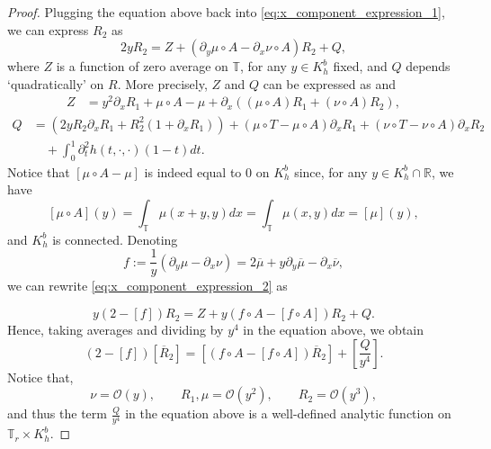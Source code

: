 \documentclass[10pt]{article}
\newcommand{\R}{\mathbb{R}}
\newcommand{\T}{\mathbb{T}}
\newcommand{\bigo}[1]{\mathcal{O}\left(#1\right)}
\begin{document}
\begin{proof}
Plugging the equation above back into \eqref{eq:x_component_expression_1}, we can express $R_2$ as
\begin{equation}
\label{eq:x_component_expression_2}
2y R_2 =  Z + (\partial_y\mu \circ A - \partial_x\nu \circ A)R_2 + Q,
\end{equation}
where $Z$ is a function of zero average on $\T$, for any $y \in K_h^b$ fixed, and $Q$ depends `quadratically' on $R$. More precisely, $Z$ and $Q$ can be expressed as
and
\begin{align*} Z & = y^2 \partial_xR_1 + \mu \circ A - \mu + \partial_x((\mu \circ A)R_1 + (\nu \circ A)R_2),
\end{align*}
\begin{equation}
\label{eq:Q_equation}
\begin{aligned}
Q & =(2yR_2 \partial_x R_1 + R^2_2(1 + \partial_x R_1)) + (\mu \circ T - \mu \circ A) \partial_x R_1 +  (\nu \circ T - \nu \circ A) \partial_x R_2 \\ & \quad + \int_0^1 \partial_t^2h(t, \cdot,\cdot) (1 -t)dt.
\end{aligned}
\end{equation}
Notice that $[\mu \circ A - \mu]$ is indeed equal to $0$ on $K_h^b$ since, for any $y \in K_h^b \cap \R$, we have
\[ [\mu \circ A](y) = \int_\T \mu(x + y, y)dx = \int_\T \mu(x, y)dx = [\mu](y),\]
and $K_h^b$ is connected. Denoting 
 \[f := \frac{1}{y} ( \partial_y \mu -  \partial_x \nu) = 2 \overline \mu + y\partial_y \overline \mu -  \partial_x \overline \nu,\] we can rewrite \eqref{eq:x_component_expression_2}  as
 
 \begin{equation*}
y\left(2 - [f]  \right)R_2 = Z + y(f \circ A - [f \circ A])R_2 + Q .
\end{equation*}
Hence, taking averages and dividing by $y^4$ in the equation above, we obtain
\begin{equation}
\label{eq:equality_average_R2}
    \left(2 - [f] \right)\left[\overline{R}_2\right] = \left[ (f \circ A - [f \circ A])\overline{R}_2  \right] + \left[ \frac{Q}{y^4} \right].
\end{equation}
 Notice that, 
 \begin{equation}
 \label{eq:decays}
     \nu = \bigo{y}, \qquad R_1, \mu = \bigo{y^2}, \qquad R_2 = \bigo{y^3},
 \end{equation}
 and thus the term $\tfrac{Q}{y^4}$ in the equation above is a well-defined analytic function on $\T_r \times K_h^b$. 
 

\end{proof}
\end{document}
